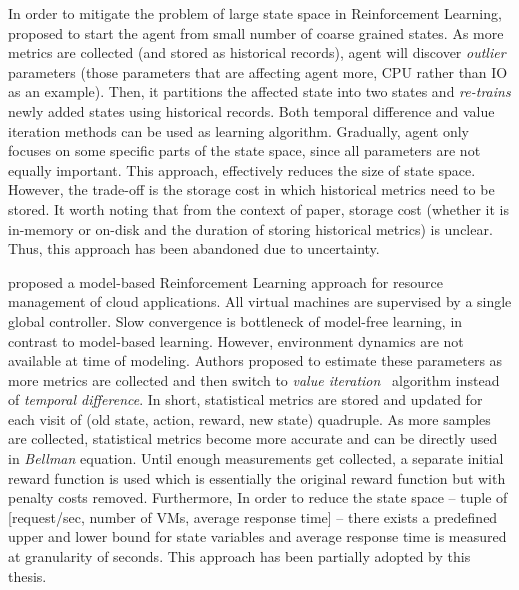 In order to mitigate the problem of large state space in Reinforcement Learning, \textcite{Lolos:2017} proposed to start the agent from small number of coarse grained states. As more metrics are collected (and stored as historical records), agent will discover \emph{outlier} parameters (those parameters that are affecting agent more, CPU rather than IO as an example). Then, it partitions the affected state into two states and \emph{re-trains} newly added states using historical records. Both temporal difference and value iteration methods can be used as learning algorithm. Gradually, agent only focuses on some specific parts of the state space, since all parameters are not equally important. This approach, effectively reduces the size of state space. However, the trade-off is the storage cost in which historical metrics need to be stored. It worth noting that from the context of paper, storage cost (whether it is in-memory or on-disk and the duration of storing historical metrics) is unclear. Thus, this approach has been abandoned due to uncertainty.

\textcite{dutreilh:hal-01122123} proposed a model-based Reinforcement Learning approach for resource management of cloud applications. All virtual machines are supervised by a single global controller. Slow convergence is bottleneck of model-free learning, in contrast to model-based learning. However, environment dynamics are not available at time of modeling. Authors proposed to estimate these parameters as more metrics are collected and then switch to \emph{value iteration}~\cite{rlIntro} algorithm instead of \emph{temporal difference}. In short, statistical metrics are stored and updated for each visit of (old state, action, reward, new state) quadruple. As more samples are collected, statistical metrics become more accurate and can be directly used in \emph{Bellman} equation. Until enough measurements get collected, a separate initial reward function is used which is essentially the original reward function but with penalty costs removed. Furthermore, In order to reduce the state space -- tuple of [request/sec, number of VMs, average response time] -- there exists a predefined upper and lower bound for state variables and average response time is measured at granularity of seconds. This approach has been partially adopted by this thesis.

